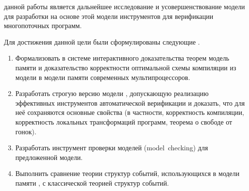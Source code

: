 


{\aim} данной работы является дальнейшее исследование и
усовершенствование модели \Wkm для разработки
на основе этой модели инструментов для верификации многопоточных программ. 

Для достижения данной цели были сформулированы следующие {\tasks}.
\begin{enumerate}[beginpenalty=10000] %
  \item
    Формализовать в системе интерактивного доказательства теорем \coq модель памяти \Wkm и
    доказательство корректности оптимальной схемы компиляции
    из модели \Wkm в модели памяти современных мультипроцессоров.
  \item
    Разработать строгую версию модели \Wkm, 
    допускающую реализацию эффективных инструментов автоматической верификации
    и доказать, что для неё сохраняются основные свойства \Wkm  
    (в частности, корректность компиляции, корректность локальных трансформаций программ, 
     теорема о свободе от гонок).
  \item
    Разработать инструмент проверки моделей (model~checking) для предложенной модели.
  \item
    Выполнить сравнение теории структур событий, использующихся в модели памяти \Wkm,
    с классической теорией структур событий.
\end{enumerate}

